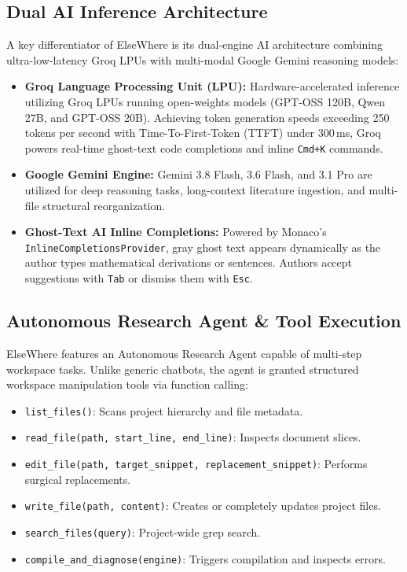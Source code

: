 \documentclass[12pt,a4paper]{article}
\newcommand{\code}[1]{\texttt{#1}}
\begin{document}
\subsection{Dual AI Inference Architecture}
A key differentiator of ElseWhere is its dual-engine AI architecture combining ultra-low-latency Groq LPUs with multi-modal Google Gemini reasoning models:
\begin{itemize}
    \item \textbf{Groq Language Processing Unit (LPU):} Hardware-accelerated inference utilizing Groq LPUs running open-weights models (GPT-OSS 120B, Qwen 27B, and GPT-OSS 20B). Achieving token generation speeds exceeding 250 tokens per second with Time-To-First-Token (TTFT) under 300\,ms, Groq powers real-time ghost-text code completions and inline \code{Cmd+K} commands.
    \item \textbf{Google Gemini Engine:} Gemini 3.8 Flash, 3.6 Flash, and 3.1 Pro are utilized for deep reasoning tasks, long-context literature ingestion, and multi-file structural reorganization.
    \item \textbf{Ghost-Text AI Inline Completions:} Powered by Monaco's \code{Inline\allowbreak Completions\allowbreak Provider}, gray ghost text appears dynamically as the author types mathematical derivations or sentences. Authors accept suggestions with \code{Tab} or dismiss them with \code{Esc}.
\end{itemize}

\subsection{Autonomous Research Agent \& Tool Execution}
ElseWhere features an Autonomous Research Agent capable of multi-step workspace tasks. Unlike generic chatbots, the agent is granted structured workspace manipulation tools via function calling:
\begin{itemize}
    \item \code{list\_files()}: Scans project hierarchy and file metadata.
    \item \code{read\_file(path, start\_line, end\_line)}: Inspects document slices.
    \item \code{edit\_file(path, target\_snippet, replacement\_snippet)}: Performs surgical replacements.
    \item \code{write\_file(path, content)}: Creates or completely updates project files.
    \item \code{search\_files(query)}: Project-wide grep search.
    \item \code{compile\_and\_diagnose(engine)}: Triggers compilation and inspects errors.
\end{itemize}
\end{document}
